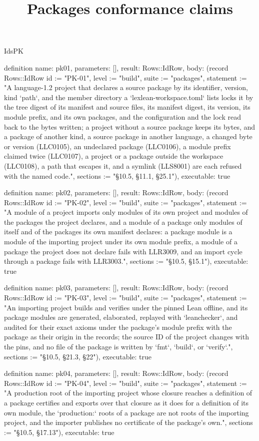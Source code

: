 \begin{lexlean}{IdsPK}
\title{Packages conformance claims}
\begin{semanticmodule}
definition{
  name: pk01,
  parameters: [],
  result: Rows::IdRow,
  body: (record Rows::IdRow {id := "PK-01", level := "build", suite := "packages", statement := "A language-1.2 project that declares a source package by its identifier, version, kind `path`, and the member directory a `lexlean-workspace.toml` lists locks it by the tree digest of its manifest and source files, its manifest digest, its version, its module prefix, and its own packages, and the configuration and the lock read back to the bytes written; a project without a source package keeps its bytes, and a package of another kind, a source package in another language, a changed byte or version (LLC0105), an undeclared package (LLC0106), a module prefix claimed twice (LLC0107), a project or a package outside the workspace (LLC0108), a path that escapes it, and a symlink (LLS8001) are each refused with the named code.", sections := "§10.5, §11.1, §25.1"}),
  executable: true
}

definition{
  name: pk02,
  parameters: [],
  result: Rows::IdRow,
  body: (record Rows::IdRow {id := "PK-02", level := "build", suite := "packages", statement := "A module of a project imports only modules of its own project and modules of the packages the project declares, and a module of a package only modules of itself and of the packages its own manifest declares: a package module is a module of the importing project under its own module prefix, a module of a package the project does not declare fails with LLR3009, and an import cycle through a package fails with LLR3003.", sections := "§10.5, §15.1"}),
  executable: true
}

definition{
  name: pk03,
  parameters: [],
  result: Rows::IdRow,
  body: (record Rows::IdRow {id := "PK-03", level := "build", suite := "packages", statement := "An importing project builds and verifies under the pinned Lean offline, and its package modules are generated, elaborated, replayed with `leanchecker`, and audited for their exact axioms under the package's module prefix with the package as their origin in the records; the source ID of the project changes with the pins, and no file of the package is written by `fmt`, `build`, or `verify`.", sections := "§10.5, §21.3, §22"}),
  executable: true
}

definition{
  name: pk04,
  parameters: [],
  result: Rows::IdRow,
  body: (record Rows::IdRow {id := "PK-04", level := "build", suite := "packages", statement := "A production root of the importing project whose closure reaches a definition of a package certifies and exports over that closure as it does for a definition of its own module, the `production:` roots of a package are not roots of the importing project, and the importer publishes no certificate of the package's own.", sections := "§10.5, §17.13"}),
  executable: true
}


\end{semanticmodule}
\end{lexlean}

